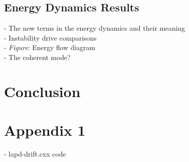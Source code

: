 \documentclass[12pt]{article}
\begin{document}
\subsection{Energy Dynamics Results}

- The new terms in the energy dynamics and their meaning \\
- Instability drive comparisons \\
- \emph{Figure}: Energy flow diagram \\
- The coherent mode? \\

\section{Conclusion}


\section{Appendix 1}

- lapd-drift.cxx code
\end{document}
